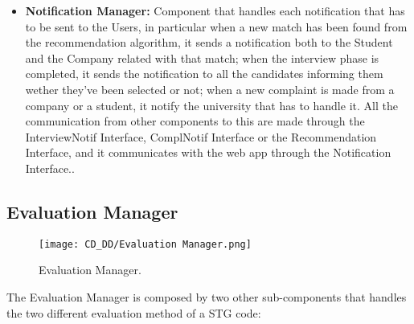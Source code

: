 \begin{itemize}
    \item \textbf{Notification Manager:} Component that handles each notification that has to be sent to the Users, in particular when a new match has been found from the recommendation algorithm, it sends a notification both to the Student and the Company related with that match; when the interview phase is completed, it sends the notification to all the candidates informing them wether they've been selected or not; when a new complaint is made from a company or a student, it notify the university that has to handle it. All the communication from other components to this are made through the InterviewNotif Interface, ComplNotif Interface or the Recommendation Interface, and it communicates with the web app through the Notification Interface..
\end{itemize}

\subsection{Evaluation Manager}
\label{subsec:evaluation_manager}%

\begin{figure}[H]
    \begin{center}
        \texttt{[image: CD\_DD/Evaluation Manager.png]}
        \caption{Evaluation Manager.}
        \label{fig:evaluation_manager}%
    \end{center}
\end{figure}

\noindent The Evaluation Manager is composed by two other sub-components that handles the two different evaluation method of a STG code:


